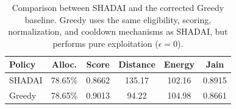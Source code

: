 \begin{table}[t]
\centering
\caption{Comparison between SHADAI and the corrected Greedy baseline. Greedy uses the same eligibility, scoring, normalization, and cooldown mechanisms as SHADAI, but performs pure exploitation ($\epsilon=0$).}
\label{tab:c22_greedy}
\begin{tabular}{lccccc}
\hline
Policy & Alloc. & Score & Distance & Energy & Jain \\
\hline
SHADAI & 78.65\% & 0.8662 & 135.17 & 102.16 & 0.8915 \\
Greedy & 78.65\% & 0.9013 & 94.22 & 104.98 & 0.8661 \\
\hline
\end{tabular}
\end{table}